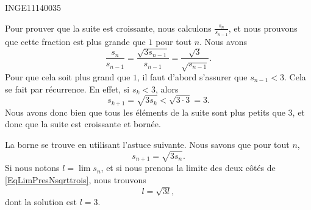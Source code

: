 

\begin{corrige}{INGE11140035}

	Pour prouver que la suite est croissante, nous calculons $\frac{ s_n }{ s_{n-1} }$, et nous prouvons que cette fraction est plus grande que $1$ pour tout $n$. Nous avons
	\begin{equation}
		\frac{ s_n }{ s_{n-1} }=\frac{ \sqrt{3 s_{n-1}} }{ s_{n-1 }}=\frac{ \sqrt{3} }{ \sqrt{s_{n-1}} }.
	\end{equation}
	Pour que cela soit plus grand que $1$, il faut d'abord s'assurer que $s_{n-1}<3$. Cela se fait par récurrence. En effet, si $s_k<3$, alors
	\begin{equation}
		s_{k+1}=\sqrt{3s_k}<\sqrt{3\cdot 3}=3.
	\end{equation}
	Nous avons donc bien que tous les éléments de la suite sont plus petits que $3$, et donc que la suite est croissante et bornée. 

	La borne se trouve en utilisant l'astuce suivante. Nous savons que pour tout $n$, 
	\begin{equation}			\label{EqLimPresNsqrttrois}
		s_{n+1}=\sqrt{3s_n}.
	\end{equation}
	Si nous notons $l=\lim s_n$, et si nous prenons la limite des deux côtés de \eqref{EqLimPresNsqrttrois}, nous trouvons
	\begin{equation}
		l=\sqrt{3l},
	\end{equation}
	dont la solution est $l=3$.

\end{corrige}
